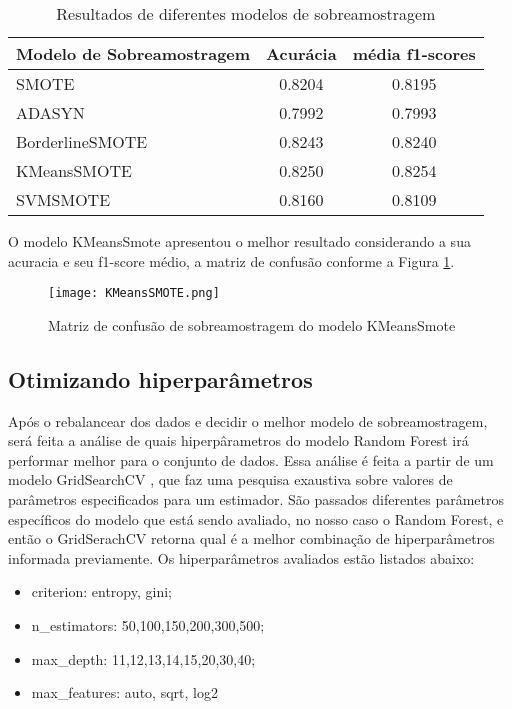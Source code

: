 \begin{table}[htb]
\centering
\caption{Resultados de diferentes modelos de sobreamostragem}
\begin{supertabular}{l|c|c}
\hline
{ Modelo de Sobreamostragem }  & { Acurácia } & { média f1-scores } \\\hline
{ SMOTE }                   & {0.8204} & {0.8195} \\\hline
{ ADASYN }                  & {0.7992} & {0.7993} \\\hline
{ BorderlineSMOTE }         & {0.8243} & {0.8240} \\\hline
{ KMeansSMOTE }             & {0.8250} & {0.8254} \\\hline
{ SVMSMOTE }                & {0.8160} & {0.8109} \\\hline

\end{supertabular}
    \legend{}
    \label{table:relatorio_sem_duplicados}
\end{table}
\FloatBarrier

O modelo KMeansSmote apresentou o melhor resultado considerando a sua acuracia e seu f1-score médio, a matriz de confusão conforme a Figura \ref{fig:cm_kmeanssmote}.

\begin{figure}[ht]
    \centering
    \texttt{[image: KMeansSMOTE.png]} 
    \caption{Matriz de confusão de sobreamostragem do modelo KMeansSmote }
    \label{fig:cm_kmeanssmote}
\end{figure}
\FloatBarrier

\subsection{Otimizando hiperparâmetros}\label{sec:MAT_MET_SEC_B_SUB_F}


Após o rebalancear dos dados e decidir o melhor modelo de sobreamostragem, será feita a análise de quais hiperpârametros do modelo Random Forest irá performar melhor para o conjunto de dados. Essa análise é feita a partir de um modelo GridSearchCV \cite{art:grid-search-cv}, que faz uma pesquisa exaustiva sobre valores de parâmetros especificados para um estimador. São passados diferentes parâmetros específicos do modelo que está sendo avaliado, no nosso caso o Random Forest\cite{art:random-forest}, e então o GridSerachCV retorna qual é a melhor combinação de hiperparâmetros informada previamente. Os hiperparâmetros avaliados estão listados abaixo:
\begin{itemize}
\item criterion: entropy, gini;
\item n\_estimators: 50,100,150,200,300,500;
\item max\_depth: 11,12,13,14,15,20,30,40;
\item max\_features: auto, sqrt, log2
\end{itemize}


